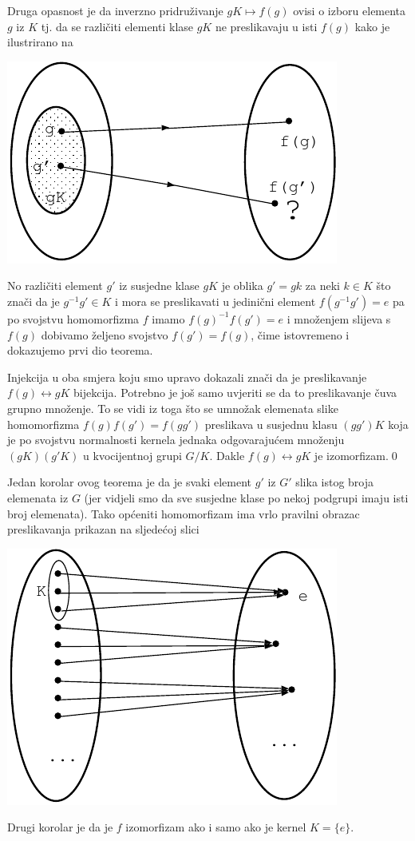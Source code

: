 Druga opasnost je da inverzno pridruživanje
$gK\mapsto f(g)$ ovisi o izboru elementa $g$ iz $K$ tj. da
se različiti elementi klase $gK$ ne preslikavaju u isti $f(g)$
kako je ilustrirano na\\[2ex]
\vspace*{3ex}
\centerline{\includegraphics[scale=0.8]{pics/homo2}}
No različiti element $g'$ iz susjedne klase $gK$ je oblika $g'=gk$ za neki
$k\in K$ što znači da je $g^{-1} g'\in K$ i mora se preslikavati
u jedinični element
$f(g^{-1}g')=e$ pa po svojstvu homomorfizma $f$ imamo 
$f(g)^{-1}f(g')=e$ i množenjem slijeva s $f(g)$ dobivamo željeno
svojstvo $f(g')=f(g)$, čime istovremeno i dokazujemo prvi dio teorema.

Injekcija u oba smjera koju smo upravo dokazali znači da je
preslikavanje $f(g)\leftrightarrow gK$ bijekcija. Potrebno je još samo
uvjeriti se da to preslikavanje čuva grupno množenje. To se vidi iz toga
što se umnožak elemenata slike homomorfizma $f(g)f(g')=f(gg')$ preslikava
u susjednu klasu $(gg')K$ koja je po svojstvu normalnosti kernela jednaka
odgovarajućem množenju $(gK)(g'K)$ u kvocijentnoj grupi $G/K$.
Dakle $f(g)\leftrightarrow gK$ je izomorfizam.\qed
  


Jedan korolar ovog teorema je da je svaki element $g'$ iz $G'$ slika
istog broja elemenata iz $G$ (jer vidjeli smo da sve susjedne klase po
nekoj podgrupi imaju isti broj elemenata). Tako općeniti homomorfizam
ima vrlo pravilni obrazac preslikavanja prikazan na sljedećoj slici\\[2ex]
\vspace*{4ex}
\centerline{\includegraphics[scale=1.0]{pics/homo3}}
Drugi korolar je da je $f$ izomorfizam ako i
samo ako je kernel $K=\{e\}$.



